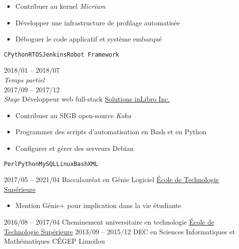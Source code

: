 \documentclass[9pt]{developercv} %
\begin{document}
\begin{minipage}[t]{0.8\textwidth}
\begin{entrylist}
		{
			\vspace{-14pt}
			\begin{itemize}
				\renewcommand{\labelitemi}{\raisebox{.45ex}{\rule{.6ex}{.6ex}}}
				\setlength\itemsep{-1pt}
				\item Contribuer au kernel \emph{Micrium}
				\item Développer une infrastructure de profilage automatisée
				\item Déboguer le code applicatif et système embarqué
			\end{itemize}
			\vspace{-4pt}
			\texttt{C}\slashsep\texttt{Python}\slashsep\texttt{RTOS}\slashsep\texttt{Jenkins}\slashsep\texttt{Robot Framework}
		}
	\entry
		{2018/01 -- 2018/07\\{\small\emph{Temps partiel}}\\2017/09 -- 2017/12\\{\small\emph{Stage}}}
		{Développeur web full-stack}
		{\href{https://inlibro.com/}{Solutions inLibro Inc.}}
		{
			\vspace{-14pt}
			\begin{itemize}
				\renewcommand{\labelitemi}{\raisebox{.45ex}{\rule{.6ex}{.6ex}}}
				\setlength\itemsep{-1pt}
				\item Contribuer au SIGB open-source \emph{Koha}
				\item Programmer des scripts d'automatisation en Bash et en Python
				\item Configurer et gérer des serveurs Debian
			\end{itemize}
			\vspace{-4pt}
			\texttt{Perl}\slashsep\texttt{Python}\slashsep\texttt{MySQL}\slashsep\texttt{Linux}\slashsep\texttt{Bash}\slashsep\texttt{XML}
		}
\end{entrylist}



\begin{entrylist}
	\setlength\itemsep{-1pt}
	\entry
		{2017/05 -- 2021/04}
		{Baccalauréat en Génie Logiciel}
		{\href{https://etsmtl.ca}{École de Technologie Supérieure}}
		{
			\vspace{-14pt}
			\begin{itemize}
				\renewcommand{\labelitemi}{\raisebox{.45ex}{\rule{.6ex}{.6ex}}}
				\setlength\itemsep{-1pt}
				\item Mention Génie+ pour implication dans la vie étudiante
			\end{itemize}
			\vspace{-8pt}
		}
	\entry
		{2016/08 -- 2017/04}
		{Cheminement universitaire en technologie}
		{\href{https://etsmtl.ca}{École de Technologie Supérieure}}
		{\vspace{-14pt}}
	\entry
		{2013/09 -- 2015/12}
		{DEC en Sciences Informatiques et Mathématiques}
		{CÉGEP Limoilou}
		{\vspace{-14pt}}
\end{entrylist}


\end{minipage}
\end{document}
